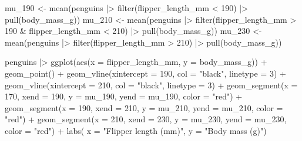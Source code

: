 \documentclass[
  letterpaper,
  DIV=11,
  numbers=noendperiod]{scrreprt}
\newenvironment{Shaded}{\begin{snugshade}}{\end{snugshade}}
\newcommand{\AttributeTok}[1]{\textcolor[rgb]{0.40,0.45,0.13}{#1}}
\newcommand{\DecValTok}[1]{\textcolor[rgb]{0.68,0.00,0.00}{#1}}
\newcommand{\FunctionTok}[1]{\textcolor[rgb]{0.28,0.35,0.67}{#1}}
\newcommand{\NormalTok}[1]{\textcolor[rgb]{0.00,0.23,0.31}{#1}}
\newcommand{\OtherTok}[1]{\textcolor[rgb]{0.00,0.23,0.31}{#1}}
\newcommand{\SpecialCharTok}[1]{\textcolor[rgb]{0.37,0.37,0.37}{#1}}
\newcommand{\StringTok}[1]{\textcolor[rgb]{0.13,0.47,0.30}{#1}}
\begin{document}
\begin{Shaded}
\begin{Highlighting}[]
\NormalTok{mu\_190 }\OtherTok{\textless{}{-}} \FunctionTok{mean}\NormalTok{(penguins }\SpecialCharTok{|\textgreater{}} \FunctionTok{filter}\NormalTok{(flipper\_length\_mm }\SpecialCharTok{\textless{}} \DecValTok{190}\NormalTok{) }\SpecialCharTok{|\textgreater{}} \FunctionTok{pull}\NormalTok{(body\_mass\_g))}
\NormalTok{mu\_210 }\OtherTok{\textless{}{-}} \FunctionTok{mean}\NormalTok{(penguins }\SpecialCharTok{|\textgreater{}} \FunctionTok{filter}\NormalTok{(flipper\_length\_mm }\SpecialCharTok{\textgreater{}} \DecValTok{190} \SpecialCharTok{\&}\NormalTok{ flipper\_length\_mm }\SpecialCharTok{\textless{}} \DecValTok{210}\NormalTok{) }\SpecialCharTok{|\textgreater{}} \FunctionTok{pull}\NormalTok{(body\_mass\_g))}
\NormalTok{mu\_230 }\OtherTok{\textless{}{-}} \FunctionTok{mean}\NormalTok{(penguins }\SpecialCharTok{|\textgreater{}} \FunctionTok{filter}\NormalTok{(flipper\_length\_mm }\SpecialCharTok{\textgreater{}} \DecValTok{210}\NormalTok{) }\SpecialCharTok{|\textgreater{}} \FunctionTok{pull}\NormalTok{(body\_mass\_g))}

\NormalTok{penguins }\SpecialCharTok{|\textgreater{}} 
  \FunctionTok{ggplot}\NormalTok{(}\FunctionTok{aes}\NormalTok{(}\AttributeTok{x =}\NormalTok{ flipper\_length\_mm, }\AttributeTok{y =}\NormalTok{ body\_mass\_g)) }\SpecialCharTok{+} 
  \FunctionTok{geom\_point}\NormalTok{() }\SpecialCharTok{+} 
  \FunctionTok{geom\_vline}\NormalTok{(}\AttributeTok{xintercept =} \DecValTok{190}\NormalTok{, }\AttributeTok{col =} \StringTok{"black"}\NormalTok{, }\AttributeTok{linetype =} \DecValTok{3}\NormalTok{) }\SpecialCharTok{+}
  \FunctionTok{geom\_vline}\NormalTok{(}\AttributeTok{xintercept =} \DecValTok{210}\NormalTok{, }\AttributeTok{col =} \StringTok{"black"}\NormalTok{, }\AttributeTok{linetype =} \DecValTok{3}\NormalTok{) }\SpecialCharTok{+}
  \FunctionTok{geom\_segment}\NormalTok{(}\AttributeTok{x =} \DecValTok{170}\NormalTok{, }\AttributeTok{xend =} \DecValTok{190}\NormalTok{,  }\AttributeTok{y =}\NormalTok{ mu\_190, }\AttributeTok{yend =}\NormalTok{ mu\_190, }\AttributeTok{color =} \StringTok{"red"}\NormalTok{) }\SpecialCharTok{+}
  \FunctionTok{geom\_segment}\NormalTok{(}\AttributeTok{x =} \DecValTok{190}\NormalTok{, }\AttributeTok{xend =} \DecValTok{210}\NormalTok{,  }\AttributeTok{y =}\NormalTok{ mu\_210, }\AttributeTok{yend =}\NormalTok{ mu\_210, }\AttributeTok{color =} \StringTok{"red"}\NormalTok{) }\SpecialCharTok{+}
  \FunctionTok{geom\_segment}\NormalTok{(}\AttributeTok{x =} \DecValTok{210}\NormalTok{, }\AttributeTok{xend =} \DecValTok{230}\NormalTok{,  }\AttributeTok{y =}\NormalTok{ mu\_230, }\AttributeTok{yend =}\NormalTok{ mu\_230, }\AttributeTok{color =} \StringTok{"red"}\NormalTok{) }\SpecialCharTok{+}
  \FunctionTok{labs}\NormalTok{(}
    \AttributeTok{x =} \StringTok{"Flipper length (mm)"}\NormalTok{, }
    \AttributeTok{y =} \StringTok{"Body mass (g)"}\NormalTok{)}
\end{Highlighting}
\end{Shaded}
\end{document}
